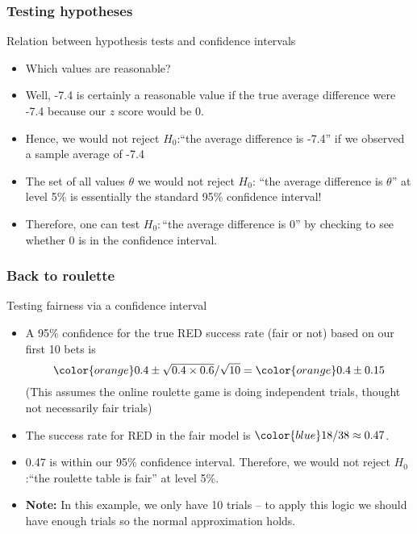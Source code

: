 \documentclass[handout]{beamer}
\begin{document}

   \begin{frame} \frametitle{Testing hypotheses}

   \begin{block}
   {Relation between hypothesis tests and confidence intervals}
   \begin{itemize}

   \item Which values are reasonable?


   \item Well, -7.4 is certainly a reasonable value if the true average
   difference were -7.4 because our $z$ score would be 0.

   \item Hence, we would not reject $H_0$:``the average difference is -7.4'' if we observed a sample average of -7.4

    \item The set of all values $\theta$ we would not reject $H_0$: ``the average difference is $\theta$'' at level 5\% is essentially the standard 95\% confidence interval!

    \item Therefore, one can test $H_0:$``the average difference is 0'' by
    checking to see whether 0 is in the confidence interval.

   \end{itemize}
   \end{block}
   \end{frame}


   \begin{frame} \frametitle{Back to roulette}

   \begin{block}
   {Testing fairness via a confidence interval}
   \begin{itemize}

   \item A 95\% confidence for the true {\color{red} RED} success rate
   (fair or not)
   based on our first 10 bets is
   $$
   {\color{orange} 0.4 \pm \sqrt{0.4 \times 0.6} / {\sqrt{10}}} =
   {\color{orange} 0.4 \pm 0.15}
   $$
   (This assumes the online roulette game is doing independent trials,
    thought not necessarily fair trials)

   \item The success rate for {\color{red} RED} in the fair model is
   ${\color{blue} 18/38 \approx 0.47}$.

    \item 0.47 is within our 95\% confidence interval. Therefore, we would
    not reject $H_0$:``the roulette table is fair'' at level 5\%.

    \item {\bf Note:} In this example, we only have 10 trials --
    to apply this logic we should have enough trials so the normal
    approximation holds.
   \end{itemize}
   \end{block}
   \end{frame}
\end{document}
